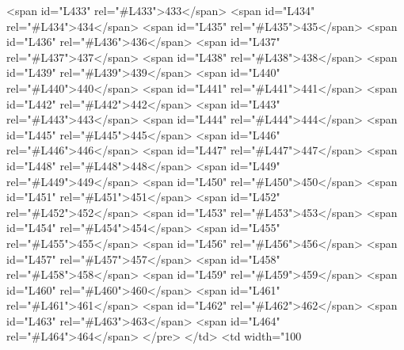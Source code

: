 <span id="L433" rel="#L433">433</span>
<span id="L434" rel="#L434">434</span>
<span id="L435" rel="#L435">435</span>
<span id="L436" rel="#L436">436</span>
<span id="L437" rel="#L437">437</span>
<span id="L438" rel="#L438">438</span>
<span id="L439" rel="#L439">439</span>
<span id="L440" rel="#L440">440</span>
<span id="L441" rel="#L441">441</span>
<span id="L442" rel="#L442">442</span>
<span id="L443" rel="#L443">443</span>
<span id="L444" rel="#L444">444</span>
<span id="L445" rel="#L445">445</span>
<span id="L446" rel="#L446">446</span>
<span id="L447" rel="#L447">447</span>
<span id="L448" rel="#L448">448</span>
<span id="L449" rel="#L449">449</span>
<span id="L450" rel="#L450">450</span>
<span id="L451" rel="#L451">451</span>
<span id="L452" rel="#L452">452</span>
<span id="L453" rel="#L453">453</span>
<span id="L454" rel="#L454">454</span>
<span id="L455" rel="#L455">455</span>
<span id="L456" rel="#L456">456</span>
<span id="L457" rel="#L457">457</span>
<span id="L458" rel="#L458">458</span>
<span id="L459" rel="#L459">459</span>
<span id="L460" rel="#L460">460</span>
<span id="L461" rel="#L461">461</span>
<span id="L462" rel="#L462">462</span>
<span id="L463" rel="#L463">463</span>
<span id="L464" rel="#L464">464</span>
</pre>
          </td>
          <td width="100%

